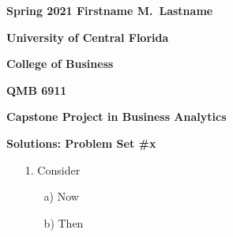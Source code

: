\documentclass[11pt]{book}
\begin{document}

\clearpage

\pagebreak
\pagestyle{empty}
{\noindent\bf Spring 2021 \hfill Firstname M.~Lastname}
\vskip 16pt
\centerline{\bf University of Central Florida}
\centerline{\bf College of Business}
\vskip 16pt
\centerline{\bf QMB 6911}
\centerline{\bf Capstone Project in Business Analytics}
\vskip 10pt
\centerline{\bf Solutions:  Problem Set \#x}
\vskip 32pt
\noindent
\begin{itemize}
\item[1.] Consider 

\begin{itemize}
\item[a)] Now

\item[b)] Then
\end{itemize}
\end{itemize}

\end{document}
